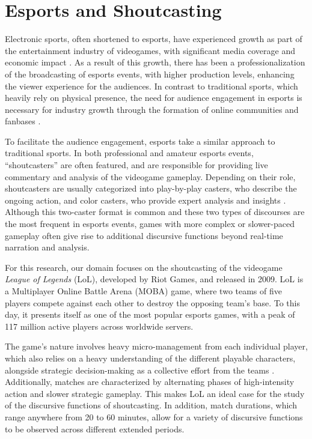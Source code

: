 \section{Esports and Shoutcasting}
\label{sec:introduction:esports_and_shoutcasting}

Electronic sports, often shortened to esports, have experienced growth as part of the entertainment industry of videogames, with significant media coverage and economic impact \cite{block2021esports}. As a result of this growth, there has been a professionalization of the broadcasting of esports events, with higher production levels, enhancing the viewer experience for the audiences. In contrast to traditional sports, which heavily rely on physical presence, the need for audience engagement in esports is necessary for industry growth through the formation of online communities and fanbases \cite{koronios2020online}.

\medskip

To facilitate the audience engagement, esports take a similar approach to traditional sports. In both professional and amateur esports events, ``shoutcasters'' are often featured, and are responsible for providing live commentary and analysis of the videogame gameplay. Depending on their role, shoutcasters are usually categorized into play-by-play casters, who describe the ongoing action, and color casters, who provide expert analysis and insights \cite{sell2015sports}. Although this two-caster format is common and these two types of discourses are the most frequent in esports events, games with more complex or slower-paced gameplay often give rise to additional discursive functions beyond real-time narration and analysis.

\medskip

For this research, our domain focuses on the shoutcasting of the videogame \textit{League of Legends} (LoL), developed by Riot Games, and released in 2009. LoL is a Multiplayer Online Battle Arena (MOBA) game, where two teams of five players compete against each other to destroy the opposing team's base. To this day, it presents itself as one of the most popular esports games, with a peak of 117 million active players across worldwide servers.

\medskip

The game's nature involves heavy micro-management from each individual player, which also relies on a heavy understanding of the different playable characters, alongside strategic decision-making as a collective effort from the teams \cite{caldeira2025collective}. Additionally, matches are characterized by alternating phases of high-intensity action and slower strategic gameplay. This makes LoL an ideal case for the study of the discursive functions of shoutcasting. In addition, match durations, which range anywhere from 20 to 60 minutes, allow for a variety of discursive functions to be observed across different extended periods.

